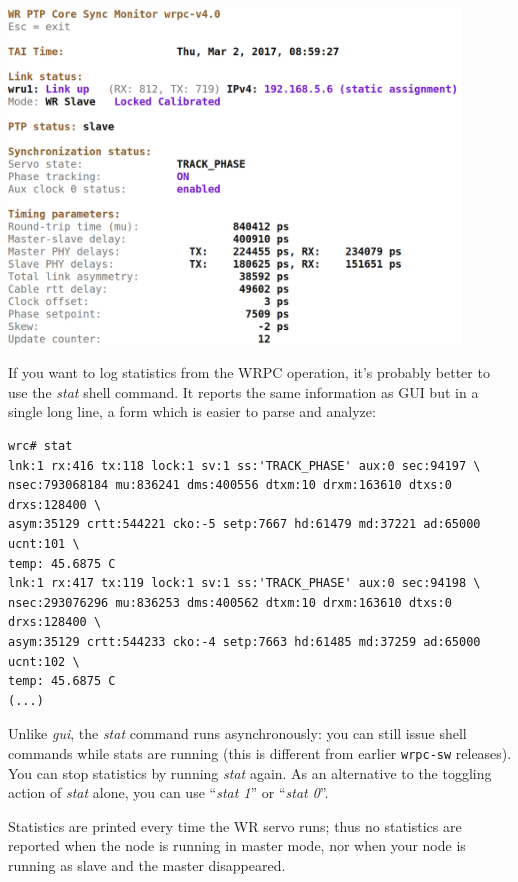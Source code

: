 \documentclass[a4paper, 12pt]{article}
\newcommand{\codeHook}[1]{\mbox{\ttfamily\MakeTextUppercase{#1}}}
\begin{document}
\vspace{1em}
\includegraphics[width=12cm]{wrpc_mon.png}
\vspace{1em}

If you want to log statistics from the \codeHook{wrpc} operation, it's probably
better to use the \textit{stat} shell command. It reports the same information as GUI
but in a single long line, a form which is easier to parse and analyze:

\begin{lstlisting}
wrc# stat
lnk:1 rx:416 tx:118 lock:1 sv:1 ss:'TRACK_PHASE' aux:0 sec:94197 \
nsec:793068184 mu:836241 dms:400556 dtxm:10 drxm:163610 dtxs:0 drxs:128400 \
asym:35129 crtt:544221 cko:-5 setp:7667 hd:61479 md:37221 ad:65000 ucnt:101 \
temp: 45.6875 C
lnk:1 rx:417 tx:119 lock:1 sv:1 ss:'TRACK_PHASE' aux:0 sec:94198 \
nsec:293076296 mu:836253 dms:400562 dtxm:10 drxm:163610 dtxs:0 drxs:128400 \
asym:35129 crtt:544233 cko:-4 setp:7663 hd:61485 md:37259 ad:65000 ucnt:102 \
temp: 45.6875 C
(...)
\end{lstlisting}

\vspace{1em}
Unlike \textit{gui}, the \textit{stat} command runs asynchronously: you can still
issue shell commands while stats are running (this is different from
earlier \texttt{wrpc-sw} releases).  You can stop statistics by running \textit{stat} again.
As an alternative to the toggling action of \textit{stat} alone, you can
use ``\textit{stat 1}'' or ``\textit{stat 0}''.

Statistics are printed every time the WR servo runs; thus no statistics
are reported when the node is running in master mode, nor when your node
is running as slave and the master disappeared.
\end{document}
